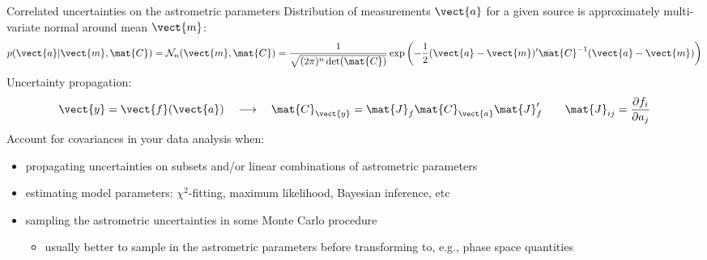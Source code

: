\documentclass[smaller, aspectratio=169]{beamer}
\begin{document}
%
%
\begin{agaframe}{Correlated uncertainties on the astrometric parameters}
  Distribution of measurements $\vect{a}$ for a given source is approximately multi-variate normal
  around mean
  $\vect{m}$:
  \begin{equation*}
    p(\vect{a}|\vect{m},\mat{C}) = {\cal N}_n(\vect{m}, \mat{C}) =
    \frac{1}{\sqrt{(2\pi)^n\det(\mat{C})}}
    \exp\left( -\frac{1}{2}(\vect{a}-\vect{m})' \mat{C}^{-1} (\vect{a}-\vect{m}) \right)
  \end{equation*}
  Uncertainty propagation:
  \begin{equation*}
    \vect{y} = \vect{f}(\vect{a}) \quad\longrightarrow\quad \mat{C}_{\vect{y}} =
    \mat{J}_f\mat{C}_{\vect{a}}\mat{J}_f^\prime \quad\quad \mat{J}_{ij} = \frac{\partial
    f_i}{\partial a_j}
  \end{equation*}
  Account for covariances in your data analysis when:
  \begin{itemize}
    \item propagating uncertainties on subsets and/or linear combinations of astrometric
      parameters
    \item estimating model parameters: $\chi^2$-fitting, maximum likelihood, Bayesian
      inference, etc
    \item sampling the astrometric uncertainties in some Monte Carlo procedure
      \begin{itemize}
        \item usually better to sample in the astrometric parameters before transforming to, e.g.,
          phase space quantities
      \end{itemize}
  \end{itemize}
\end{agaframe}
%
%
\end{document}
